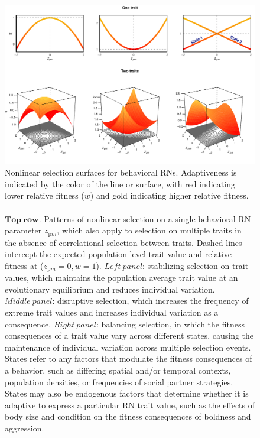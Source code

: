 \documentclass{article}
\begin{document}
\begin{figure}
\hspace*{-1.75cm}
\includegraphics[scale=0.7]{fig2.pdf}
\caption{Nonlinear selection surfaces for behavioral RNs. Adaptiveness is indicated by the color of the line or surface, with red indicating lower relative fitness ($w$) and gold indicating higher relative fitness. \\ \\
$\boldsymbol{Top \ row}$. Patterns of nonlinear selection on a single behavioral RN parameter ${z_{\mathrm{p}m}}$, which also apply to selection on multiple traits in the absence of correlational selection between traits. Dashed lines intercept the expected population-level trait value and relative fitness at (${z_{\mathrm{p}m}}=0, {w}=1$). $Left \ panel$: stabilizing selection on trait values, which maintains the population average trait value at an evolutionary equilibrium and reduces individual variation. $Middle \ panel$: disruptive selection, which increases the frequency of extreme trait values and increases individual variation as a consequence. $Right \ panel$: balancing selection, in which the fitness consequences of a trait value vary across different states, causing the maintenance of individual variation across multiple selection events. States refer to any factors that modulate the fitness consequences of a behavior, such as differing spatial and/or temporal contexts, population densities, or frequencies of social partner strategies. States may also be endogenous factors that determine whether it is adaptive to express a particular RN trait value, such as the effects of body size and condition on the fitness consequences of boldness and aggression.  \\ \\
}
\end{figure}
\end{document}
